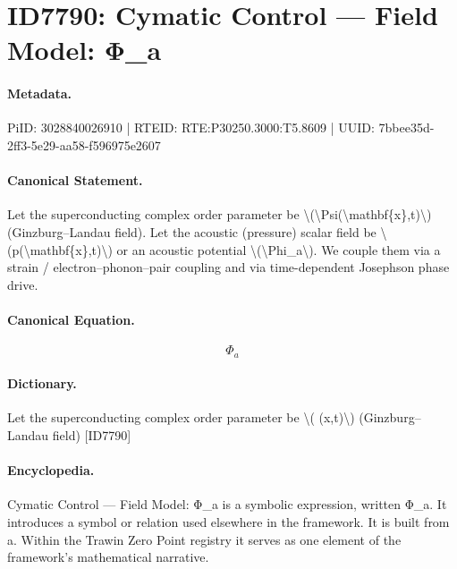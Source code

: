 \section*{ID7790: Cymatic Control — Field Model: Φ\_a}
\paragraph{Metadata.}
PiID: 3028840026910 | RTEID: RTE:P30250.3000:T5.8609 | UUID: 7bbee35d-2ff3-5e29-aa58-f596975e2607

\paragraph{Canonical Statement.}
Let the superconducting complex order parameter be \textbackslash{}(\textbackslash{}Psi(\textbackslash{}mathbf\{x\},t)\textbackslash{}) (Ginzburg–Landau field). Let the acoustic (pressure) scalar field be \textbackslash{}(p(\textbackslash{}mathbf\{x\},t)\textbackslash{}) or an acoustic potential \textbackslash{}(\textbackslash{}Phi\_a\textbackslash{}). We couple them via a strain / electron–phonon–pair coupling and via time-dependent Josephson phase drive.

\paragraph{Canonical Equation.}
\[
\Phi_a
\]

\paragraph{Dictionary.}
Let the superconducting complex order parameter be \textbackslash{}( (x,t)\textbackslash{}) (Ginzburg–Landau field) [ID7790]

\paragraph{Encyclopedia.}
Cymatic Control — Field Model: Φ\_a is a symbolic expression, written Φ\_a. It introduces a symbol or relation used elsewhere in the framework. It is built from a. Within the Trawin Zero Point registry it serves as one element of the framework's mathematical narrative.
